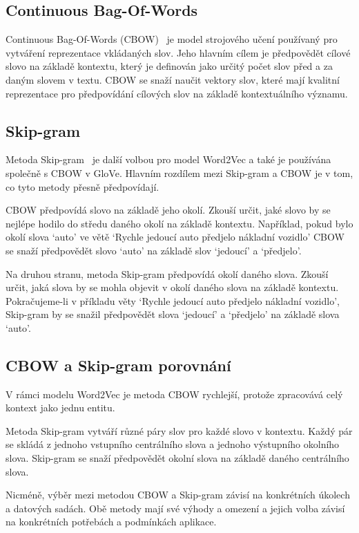 \subsection{Continuous Bag-Of-Words}
Continuous Bag-Of-Words (CBOW)~\cite{link12} je model strojového učení používaný pro vytváření reprezentace vkládaných slov.
Jeho hlavním cílem je předpovědět cílové slovo na základě kontextu, který je definován jako určitý počet slov před a za daným slovem v textu.
CBOW se snaží naučit vektory slov, které mají kvalitní reprezentace pro předpovídání cílových slov na základě kontextuálního významu.

\subsection{Skip-gram}
Metoda Skip-gram~\cite{link13} je další volbou pro model Word2Vec a také je používána společně s CBOW v GloVe.
Hlavním rozdílem mezi Skip-gram a CBOW je v tom, co tyto metody přesně předpovídají.

CBOW předpovídá slovo na základě jeho okolí.
Zkouší určit, jaké slovo by se nejlépe hodilo do středu daného okolí na základě kontextu.
Například, pokud bylo okolí slova `auto' ve větě `Rychle jedoucí auto předjelo nákladní vozidlo' CBOW se snaží předpovědět slovo `auto' na základě slov `jedoucí' a `předjelo'.

Na druhou stranu, metoda Skip-gram předpovídá okolí daného slova.
Zkouší určit, jaká slova by se mohla objevit v okolí daného slova na základě kontextu.
Pokračujeme-li v příkladu věty `Rychle jedoucí auto předjelo nákladní vozidlo', Skip-gram by se snažil předpovědět slova `jedoucí' a `předjelo' na základě slova `auto'.

\subsection{CBOW a Skip-gram porovnání}
V rámci modelu Word2Vec je metoda CBOW rychlejší, protože zpracovává celý kontext jako jednu entitu.

Metoda Skip-gram vytváří různé páry slov pro každé slovo v kontextu.
Každý pár se skládá z jednoho vstupního centrálního slova a jednoho výstupního okolního slova.
Skip-gram se snaží předpovědět okolní slova na základě daného centrálního slova.

Nicméně, výběr mezi metodou CBOW a Skip-gram závisí na konkrétních úkolech a datových sadách.
Obě metody mají své výhody a omezení a jejich volba závisí na konkrétních potřebách a podmínkách aplikace.

